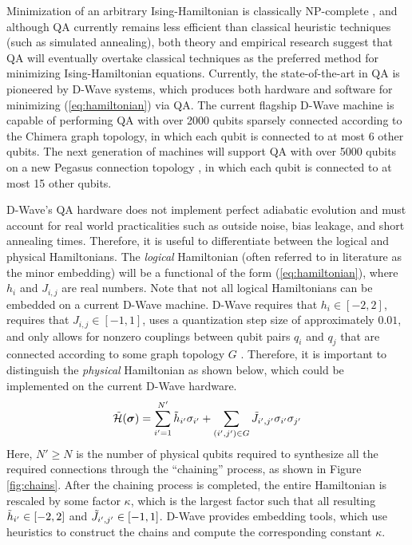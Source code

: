 Minimization of an arbitrary Ising-Hamiltonian is classically NP-complete \cite{barahona1982computational}, and although QA currently remains less efficient than classical heuristic techniques (such as simulated annealing), both theory \cite{santoro2002theory} and empirical research \cite{boixo2014evidence} suggest that QA will eventually overtake classical techniques as the preferred method for minimizing Ising-Hamiltonian equations.
Currently, the state-of-the-art in QA is pioneered by D-Wave systems, which produces both hardware and software for minimizing (\ref{eq:hamiltonian}) via QA.
The current flagship D-Wave machine is capable of performing QA with over 2000 qubits sparsely connected according to the Chimera graph topology, in which each qubit is connected to at most 6 other qubits. 
The next generation of machines will support QA with over 5000 qubits on a new Pegasus connection topology \cite{boothby2018next}, in which each qubit is connected to at most 15 other qubits.

D-Wave's QA hardware does not implement perfect adiabatic evolution and must account for real world practicalities such as outside noise, bias leakage, and short annealing times.
Therefore, it is useful to differentiate between the logical and physical Hamiltonians.
The {\it logical} Hamiltonian (often referred to in literature as the minor embedding) will be a functional of the form (\ref{eq:hamiltonian}), where $h_i$ and $J_{i,j}$ are real numbers.
Note that not all logical Hamiltonians can be embedded on a current D-Wave machine.
D-Wave requires that $h_i \in [-2,2]$, requires that $J_{i,j}\in[-1,1]$, uses a quantization step size of approximately $0.01$, and only allows for nonzero couplings between qubit pairs $q_i$ and $q_j$ that are connected according to some graph topology $G$ \cite{karimi2019practical}.
Therefore, it is important to distinguish the {\it physical} Hamiltonian as shown below, which could be implemented on the current D-Wave hardware.
\begin{equation}
\Tilde{\mathcal{H}}(\text{\boldmath{$\sigma$}}) = \sum_{i'=1}^{N'}\Tilde{h}_{i'}\sigma_{i'} + \sum_{(i',j') \in G} \Tilde{J}_{i',j'} \sigma_{i'} \sigma_{j'}
\label{eq:physical}
\end{equation}
Here, $N' \geq N$ is the number of physical qubits required to synthesize all the required connections through the ``chaining'' process, as shown in Figure \ref{fig:chains}.
After the chaining process is completed, the entire Hamiltonian is rescaled by some factor $\kappa$, which is the largest factor such that all resulting $\Tilde{h}_{i'} \in [-2,2]$ and $\Tilde{J}_{i',j'} \in [-1,1]$.
D-Wave provides embedding tools, which use heuristics to construct the chains and compute the corresponding constant $\kappa$.

